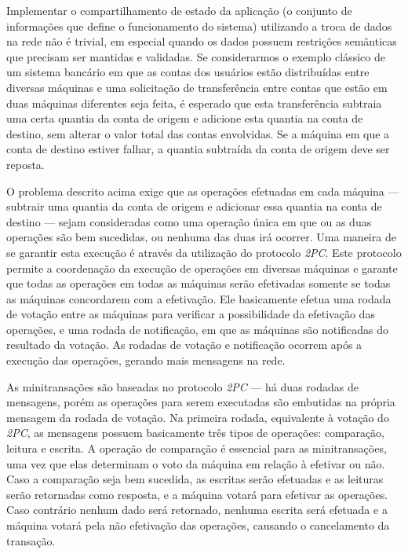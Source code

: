 \documentclass[11pt,twoside,a4paper]{book}
\begin{document}
Implementar o compartilhamento de estado da aplicação (o conjunto de informações que define o funcionamento do sistema) utilizando a troca de dados na rede não é trivial, em especial quando os dados possuem restrições semânticas que precisam ser mantidas e validadas. Se considerarmos o exemplo clássico de um sistema bancário em que as contas dos usuários estão distribuídas entre diversas máquinas e uma solicitação de transferência entre contas que estão em duas máquinas diferentes seja feita, é esperado que esta transferência subtraia uma certa quantia da conta de origem e adicione esta quantia na conta de destino, sem alterar o valor total das contas envolvidas. Se a máquina em que a conta de destino estiver falhar, a quantia subtraída da conta de origem deve ser reposta.

O problema descrito acima exige que as operações efetuadas em cada máquina --- subtrair uma quantia da conta de origem e adicionar essa quantia na conta de destino --- sejam consideradas como uma operação única em que ou as duas operações são bem sucedidas, ou nenhuma das duas irá ocorrer. Uma maneira de se garantir esta execução é através da utilização do protocolo \emph{2PC}. Este protocolo permite a coordenação da execução de operações em diversas máquinas e garante que todas as operações em todas as máquinas serão efetivadas somente se todas as máquinas concordarem com a efetivação. Ele basicamente efetua uma rodada de votação entre as máquinas para verificar a possibilidade da efetivação das operações, e uma rodada de notificação, em que as máquinas são notificadas do resultado da votação. As rodadas de votação e notificação ocorrem após a execução das operações, gerando mais mensagens na rede.

As minitransações são baseadas no protocolo \emph{2PC} --- há duas rodadas de mensagens, porém as operações para serem executadas são embutidas na própria mensagem da rodada de votação. Na primeira rodada, equivalente à votação do \emph{2PC}, as mensagens possuem basicamente três tipos de operações: comparação, leitura e escrita. A operação de comparação é essencial para as minitransações, uma vez que elas determinam o voto da máquina em relação à efetivar ou não. Caso a comparação seja bem sucedida, as escritas serão efetuadas e as leituras serão retornadas como resposta, e a máquina votará para efetivar as operações. Caso contrário nenhum dado será retornado, nenhuma escrita será efetuada e a máquina votará pela não efetivação das operações, causando o cancelamento da transação.
\end{document}
